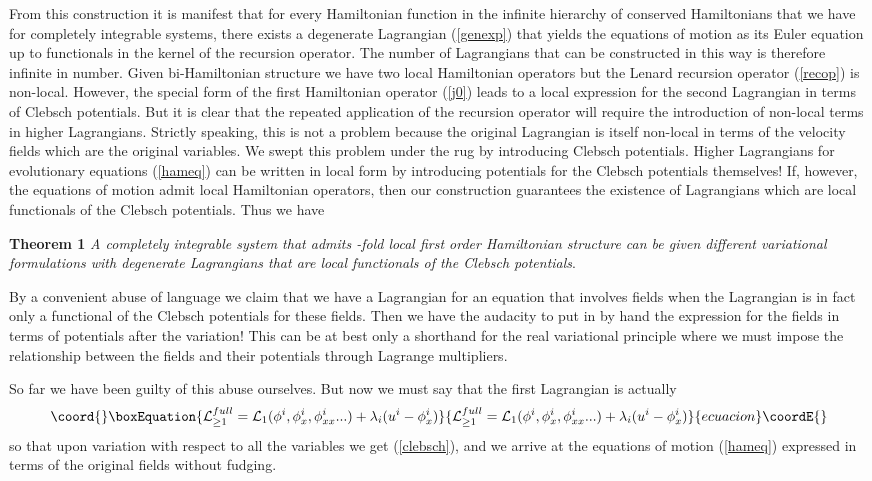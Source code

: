 \documentclass[a4paper,12pt]{article}
\begin{document}
From this construction it is manifest that for every Hamiltonian
function in the infinite hierarchy of conserved Hamiltonians that
we have for completely integrable systems, there exists a
degenerate Lagrangian (\ref{genexp}) that yields the equations of
motion as its Euler equation up to functionals in the kernel of
the recursion operator. The number of Lagrangians that can be
constructed in this way is therefore infinite in number. Given
bi-Hamiltonian structure we have two local Hamiltonian operators
but the Lenard recursion operator (\ref{recop}) is non-local.
However, the special form of the first Hamiltonian operator
(\ref{j0}) leads to a local expression for the second Lagrangian
in terms of Clebsch potentials. But it is clear that the repeated
application of the recursion operator will require the
introduction of non-local terms in higher Lagrangians. Strictly
speaking, this is not a problem because the original Lagrangian is
itself non-local in terms of the velocity fields \coordHE{} which are
the original variables. We swept this problem under the rug by
introducing Clebsch potentials. Higher Lagrangians for
evolutionary equations (\ref{hameq}) can be written in local form
by introducing potentials for the Clebsch potentials themselves!
If, however, the equations of motion admit \coordHE{} local Hamiltonian
operators, then our construction guarantees the existence of \coordHE{}
Lagrangians which are local functionals of the Clebsch potentials.
Thus we have

{\bf Theorem 1} {\it A completely integrable system that admits
\coordHE{}-fold local first order Hamiltonian structure can be given \coordHE{}
different variational formulations with degenerate Lagrangians
that are local functionals of the Clebsch potentials}.

By a convenient abuse of language we claim that we have a
Lagrangian for an equation that involves fields when the
Lagrangian is in fact only a functional of the Clebsch potentials
for these fields. Then we have the audacity to put in by hand the
expression for the fields in terms of potentials after the
variation! This can be at best only a shorthand for the real
variational principle where we must impose the relationship
between the fields and their potentials through Lagrange
multipliers.

So far we have been guilty of this abuse ourselves. But now we
must say that the first Lagrangian is actually
\begin{equation}\coord{}\boxEquation{
{\cal L}_{\ge 1}^{full} = {\cal L}_1(\phi^i, \phi^i_x,
\phi^i_{xx}...) + \lambda_i ( u^i - \phi^i_x ) \label{reallag}
}{
{\cal L}_{\ge 1}^{full} = {\cal L}_1(\phi^i, \phi^i_x,
\phi^i_{xx}...) + \lambda_i ( u^i - \phi^i_x ) }{ecuacion}\coordE{}\end{equation}
so that upon variation with respect to all the variables \coordHE{} we get (\ref{clebsch}), \coordHE{} and we
arrive at the equations of motion (\ref{hameq}) expressed in terms
of the original fields \coordHE{} without fudging.
\end{document}
